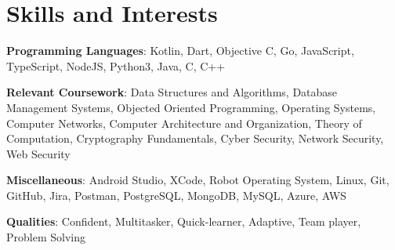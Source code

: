 \documentclass[a4paper,11pt]{article}
\begin{document}
\vspace{-12pt}
   
\section{Skills and Interests}
 \begin{itemize}[leftmargin=0.15in, label={}]
    \small{\item{
 
     \textbf{Programming Languages}{: Kotlin, Dart, Objective C, Go, JavaScript, TypeScript, NodeJS, Python3, Java, C, C++}

  \textbf{Relevant Coursework}{:  Data Structures and Algorithms, Database Management Systems, Objected Oriented Programming, Operating Systems, Computer Networks, Computer Architecture and Organization, Theory of Computation, Cryptography Fundamentals, Cyber Security, Network Security, Web Security}

\textbf{Miscellaneous}{:  Android Studio, XCode, Robot Operating System, Linux, Git, GitHub, Jira, Postman, PostgreSQL, MongoDB, MySQL, Azure, AWS}

\textbf{Qualities}{: Confident, Multitasker, Quick-learner, Adaptive, Team player, Problem Solving}
     
    }}
 \end{itemize}
 
\vspace{-12pt}
\end{document}
